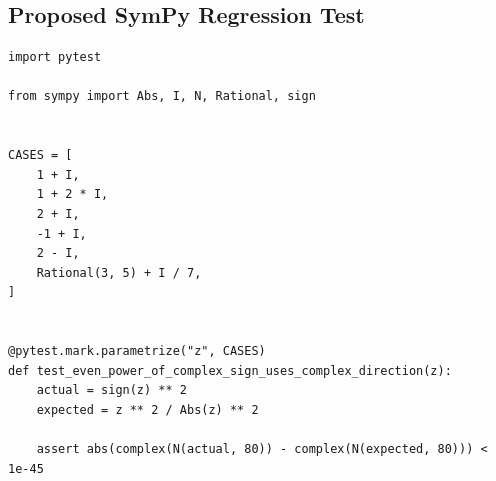 \documentclass[11pt]{article}
\begin{document}
\subsection{Proposed SymPy Regression Test}

\medskip

\begin{lstlisting}[style=bugpython]
import pytest

from sympy import Abs, I, N, Rational, sign


CASES = [
    1 + I,
    1 + 2 * I,
    2 + I,
    -1 + I,
    2 - I,
    Rational(3, 5) + I / 7,
]


@pytest.mark.parametrize("z", CASES)
def test_even_power_of_complex_sign_uses_complex_direction(z):
    actual = sign(z) ** 2
    expected = z ** 2 / Abs(z) ** 2

    assert abs(complex(N(actual, 80)) - complex(N(expected, 80))) < 1e-45
\end{lstlisting}
\end{document}
